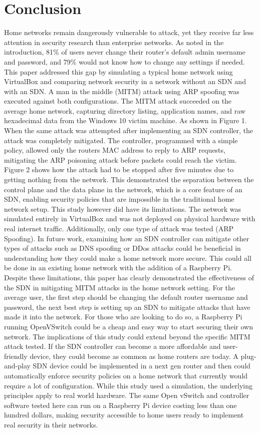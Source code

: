 \documentclass[12pt]{article}
\begin{document}
\section{Conclusion}
Home networks remain dangerously vulnerable to attack, yet they receive far less attention in security 
research than enterprise networks. As noted in the introduction, 81\% of users never change their router's 
default admin username and password, and 79\% would not know how to change any settings if needed. This 
paper addressed this gap by simulating a typical home network using VirtualBox and comparing network 
security in a network without an SDN and with an SDN. A man in the middle (MITM) attack using ARP spoofing 
was executed against both configurations. 
The MITM attack succeeded on the average home network, capturing directory listing, application names, and 
raw hexadecimal data from the Windows 10 victim machine. As shown in Figure 1. When the same attack was 
attempted after implementing an SDN controller, the attack was completely mitigated. The controller, 
programmed with a simple policy, allowed only the routers MAC address to reply to ARP requests, mitigating 
the ARP poisoning attack before packets could reach the victim. Figure 2 shows how the attack had to be 
stopped after five minutes due to getting nothing from the network. This demonstrated the separation between 
the control plane and the data plane in the network, which is a core feature of an SDN, enabling security 
policies that are impossible in the traditional home network setup.
This study however did have its limitations. The network was simulated entirely in VirtualBox and was not 
deployed on physical hardware with real internet traffic. Additionally, only one type of attack was tested 
(ARP Spoofing). In future work, examining how an SDN controller can mitigate other types of attacks such as 
DNS spoofing or DDos attacks could be beneficial in understanding how they could make a home network more 
secure. This could all be done in an existing home network with the addition of a Raspberry Pi. Despite 
these limitations, this paper has clearly demonstrated the effectiveness of the SDN in mitigating MITM 
attacks in the home network setting. For the average user, the first step should be changing the default 
router username and password, the next best step is setting up an SDN to mitigate attacks that have made 
it into the network. For those who are looking to do so, a Raspberry Pi running OpenVSwitch could be a 
cheap and easy way to start securing their own network.
The implications of this study could extend beyond the specific MITM attack tested. If the SDN controller 
can become a more affordable and user-friendly device, they could become as common as home routers are today. 
A plug-and-play SDN device could be implemented in a next gen router and then could automatically enforce 
security policies on a home network that currently would require a lot of configuration. While this study 
used a simulation, the underlying principles apply to real world hardware. The same Open vSwitch and 
controller software tested here can run on a Raspberry Pi device costing less than one hundred dollars, 
making security accessible to home users ready to implement real security in their networks. 
\end{document}

